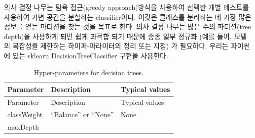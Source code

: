 \documentclass[10.5pt]{book}
\theoremstyle{definition}
\theoremstyle{definition}
\theoremstyle{definition}
\theoremstyle{remark}
\begin{document}
의사 결정 나무는 탐욕 접근(greedy approach)방식을 사용하여 선택한 개별
테스트를 사용하여 가변 공간을 분할하는 classifier이다. 이것은 클래스를
분리하는 데 가장 많은 정보를 얻는 파티션을 찾는 것을 목표로 한다. 의사
결정 나무는 많은 수의 파티션(tree depth)을 사용하게 되면 쉽게 과적합
되기 때문에 종종 일부 정규화 (예를 들어, 모델의 복잡성을 제한하는
하이퍼-파라미터의 정리 또는 지정) 가 필요하다. 우리는 파이썬에 있는
sklearn DecisionTreeClassifier 구현을 사용한다. 

\begin{longtable}[]{@{}lll@{}}
\caption{\label{tab:decisionTreeParameters} Hyper-parameters for decision
trees.}\tabularnewline
\toprule
\begin{minipage}[b]{0.13\columnwidth}\raggedright\strut
Parameter\strut
\end{minipage} & \begin{minipage}[b]{0.16\columnwidth}\raggedright\strut
Description\strut
\end{minipage} & \begin{minipage}[b]{0.20\columnwidth}\raggedright\strut
Typical values\strut
\end{minipage}\tabularnewline
\midrule
\endfirsthead
\toprule
\begin{minipage}[b]{0.13\columnwidth}\raggedright\strut
Parameter\strut
\end{minipage} & \begin{minipage}[b]{0.16\columnwidth}\raggedright\strut
Description\strut
\end{minipage} & \begin{minipage}[b]{0.20\columnwidth}\raggedright\strut
Typical values\strut
\end{minipage}\tabularnewline
\midrule
\endhead
\begin{minipage}[t]{0.13\columnwidth}\raggedright\strut
classWeight\strut
\end{minipage} & \begin{minipage}[t]{0.16\columnwidth}\raggedright\strut
``Balance'' or ``None''\strut
\end{minipage} & \begin{minipage}[t]{0.20\columnwidth}\raggedright\strut
None\strut
\end{minipage}\tabularnewline
\begin{minipage}[t]{0.13\columnwidth}\raggedright\strut
maxDepth\strut
\end{minipage} & \begin{minipage}[t]{0.16\columnwidth}\raggedright\strut

\end{minipage}
\end{longtable}
\end{document}
